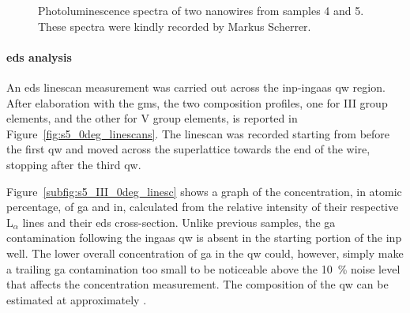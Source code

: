 \begin{figure}
    \centering
    \caption[Photoluminescence spectra of two nanowires from samples 4 and 5.]{Photoluminescence spectra of two nanowires from samples 4 and 5. These spectra were kindly recorded by Markus Scherrer.}
    \label{fig:s5_pl}
\end{figure}

\paragraph{\acs{eds} analysis} An \acs{eds} linescan measurement was carried out across the \acs{inp}-\acs{ingaas} \acl{qw} region. After elaboration with the \acf{gms}, the two composition profiles, one for III group elements, and the other for V group elements, is reported in Figure~\ref{fig:s5_0deg_linescans}. The linescan was recorded starting from before the first \acl{qw} and moved across the superlattice towards the end of the wire, stopping after the third \acl{qw}.

Figure~\ref{subfig:s5_III_0deg_linesc} shows a graph of the concentration, in atomic percentage, of \acl{ga} and \acl{in}, calculated from the relative intensity of their respective L\(_\alpha\) lines and their \acs{eds} cross-section. Unlike previous samples, the \acl{ga} contamination following the \acs{ingaas} \acl{qw} is absent in the starting portion of the \acs{inp} well. The lower overall concentration of \acl{ga} in the \acl{qw} could, however, simply make a trailing \acl{ga} contamination too small to be noticeable above the \qty{10}{\%} noise level that affects the concentration measurement. The composition of the \acl{qw} can be estimated at approximately .

